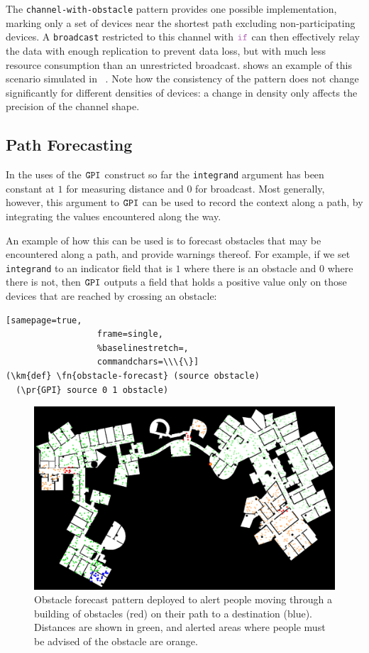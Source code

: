 \documentclass[12pt,a4paper,twoside,openright]{book}
\begin{document}
The {\tt channel-with-obstacle} pattern provides one possible implementation, marking only a set of devices near the shortest path excluding non-participating devices.
%
A {\tt broadcast} restricted to this channel with $\ifN$ can then effectively relay the data with enough replication to prevent data loss, but with much less resource consumption than an unrestricted broadcast.
%
 shows an example of this scenario simulated in \alchemist{}~\cite{alchemist-jos2013}.
%
Note how the consistency of the pattern does not change significantly for different densities of devices: a change in density only affects the precision of the channel shape.

\subsection{Path Forecasting}

In the uses of the $\texttt{GPI}$ construct so far the {\tt integrand} argument has been constant at $1$ for measuring distance and $0$ for broadcast.
%
Most generally, however, this argument to $\texttt{GPI}$ can be used to record the context along a path, by integrating the values encountered along the way.

An example of how this can be used is to forecast obstacles that may be encountered along a path, and provide warnings thereof.  
%
For example, if we set {\tt integrand} to an indicator field that is $1$ where there is an obstacle and $0$ where there is not, then $\texttt{GPI}$ outputs a field that holds a positive value only on those devices that are reached by crossing an obstacle:
\begin{Verbatim}[samepage=true,
                  frame=single,
                  %baselinestretch=,
                  commandchars=\\\{\}]
(\km{def} \fn{obstacle-forecast} (source obstacle)
  (\pr{GPI} source 0 1 obstacle)
\end{Verbatim}

\begin{figure}
\centering
\includegraphics[width=\columnwidth]{img/shots-5-mit}
\caption[Indoor obstacle forecast]{Obstacle forecast pattern deployed to alert people moving through a building of obstacles (red) on their path to a destination (blue).
%
Distances are shown in green, and alerted areas where people must be advised of the obstacle are orange.}
\label{f:sector}
\end{figure}
\end{document}
